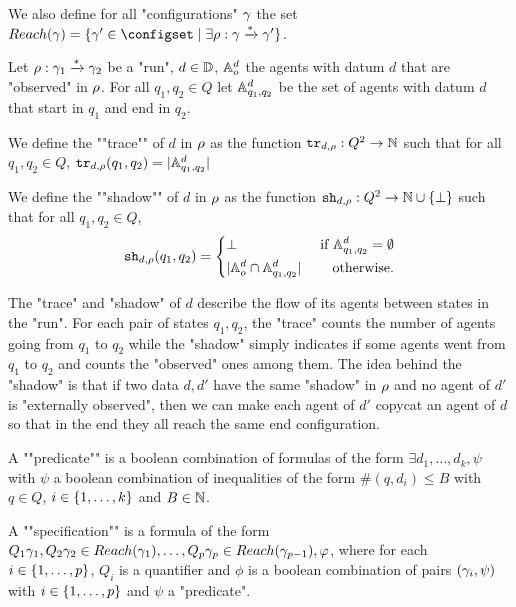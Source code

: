 We also define for all "configurations" $\gamma$ the set $\Reach(\config) = \set{\config' \in \configset \mid \exists \run : \config \xrightarrow{*} \config'}$.


\begin{definition}
	Let $\rho : \gamma_1 \xrightarrow{*} \gamma_2$ be a "run", $d\in \mathbb{D}$, $\mathbb{A}^d_o$ the agents with datum $d$ that are "observed" in $\rho$. For all $q_1, q_2 \in Q$ let $\mathbb{A}^d_{q_1, q_2}$ be the set of agents with datum $d$ that start in $q_1$ and end in $q_2$.
	
	We define the ""trace"" of $d$ in $\rho$ as the function $\mathtt{tr}_{d,\rho} : Q^2 \to \mathbb{N}$ such that for all $q_1, q_2 \in Q$,	$\mathtt{tr}_{d,\rho}(q_1, q_2) = |\mathbb{A}^d_{q_1, q_2}|$
		
	
	We define the ""shadow"" of $d$ in $\rho$ as the function $\mathtt{sh}_{d,\rho} : Q^2 \to \mathbb{N} \cup \{\bot\}$ such that for all $q_1, q_2 \in Q$, 
	\begin{equation}
		\mathtt{sh}_{d,\rho}(q_1, q_2) = 
		\left\{
		\begin{aligned}
			&\bot &\text{ if } \mathbb{A}^d_{q_1,q_2} =\emptyset\\
			&|\mathbb{A}^d_o \cap \mathbb{A}^d_{q_1, q_2}| &\text{ otherwise.}
		\end{aligned}
		\right.
	\end{equation}
\end{definition}
%	
The "trace" and "shadow" of $d$ describe the flow of its agents between states in the "run". For each pair of states $q_1, q_2$, the "trace" counts the number of agents going from $q_1$ to $q_2$ while
the "shadow" simply indicates if some agents went from $q_1$ to $q_2$ and counts the "observed" ones among them. The idea behind the "shadow" is that if two data $d, d'$ have the same "shadow" in $\rho$ and no agent of $d'$ is "externally observed", then we can make each agent of $d'$ copycat an agent of $d$ so that in the end they all reach the same end configuration.


\begin{definition}
	A ""predicate"" is a boolean combination of formulas of the form $\exists d_1, \ldots, d_k, \psi$ with $\psi$ a boolean combination of inequalities of the form $\#(q,d_i) \leq B$ with $q\in Q$, $i \in \{1,\dots,k\}$ and $B \in \mathbb{N}$.
	
	A ""specification"" is a formula of the form $Q_1 \gamma_1, Q_2 \gamma_2  \in Reach(\gamma_1), \ldots, Q_p \gamma_p \in Reach(\gamma_{p-1}), \varphi$, where for each $i \in \{1,\dots,p\}$, $Q_i$ is a quantifier and $\phi$ is a boolean combination of pairs $(\gamma_i, \psi)$ with $i \in \{1,\dots,p\}$ and $\psi$ a "predicate".
\end{definition}
